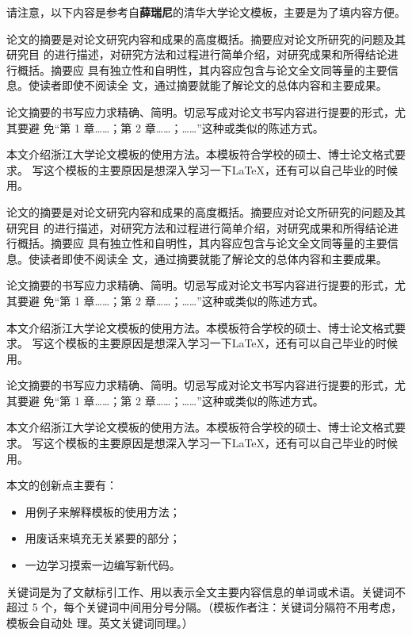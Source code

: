 
\begin{cabstract}
请注意，以下内容是参考自\textbf{薛瑞尼}的清华大学论文模板，主要是为了填内容方便。

论文的摘要是对论文研究内容和成果的高度概括。摘要应对论文所研究的问题及其研究目
的进行描述，对研究方法和过程进行简单介绍，对研究成果和所得结论进行概括。摘要应
具有独立性和自明性，其内容应包含与论文全文同等量的主要信息。使读者即使不阅读全
文，通过摘要就能了解论文的总体内容和主要成果。

论文摘要的书写应力求精确、简明。切忌写成对论文书写内容进行提要的形式，尤其要避
免“第 1 章……；第 2 章……；……”这种或类似的陈述方式。

本文介绍浙江大学论文模板的使用方法。本模板符合学校的硕士、博士论文格式要求。
写这个模板的主要原因是想深入学习一下\LaTeX，还有可以自己毕业的时候用。

论文的摘要是对论文研究内容和成果的高度概括。摘要应对论文所研究的问题及其研究目
的进行描述，对研究方法和过程进行简单介绍，对研究成果和所得结论进行概括。摘要应
具有独立性和自明性，其内容应包含与论文全文同等量的主要信息。使读者即使不阅读全
文，通过摘要就能了解论文的总体内容和主要成果。

论文摘要的书写应力求精确、简明。切忌写成对论文书写内容进行提要的形式，尤其要避
免“第 1 章……；第 2 章……；……”这种或类似的陈述方式。

本文介绍浙江大学论文模板的使用方法。本模板符合学校的硕士、博士论文格式要求。
写这个模板的主要原因是想深入学习一下\LaTeX，还有可以自己毕业的时候用。




论文摘要的书写应力求精确、简明。切忌写成对论文书写内容进行提要的形式，尤其要避
免“第 1 章……；第 2 章……；……”这种或类似的陈述方式。

本文介绍浙江大学论文模板的使用方法。本模板符合学校的硕士、博士论文格式要求。
写这个模板的主要原因是想深入学习一下\LaTeX，还有可以自己毕业的时候用。

本文的创新点主要有：
\begin{itemize}
	\item 用例子来解释模板的使用方法；
	\item 用废话来填充无关紧要的部分；
	\item 一边学习摸索一边编写新代码。
\end{itemize}

关键词是为了文献标引工作、用以表示全文主要内容信息的单词或术语。关键词不超过 5
个，每个关键词中间用分号分隔。（模板作者注：关键词分隔符不用考虑，模板会自动处
理。英文关键词同理。）
\end{cabstract}

